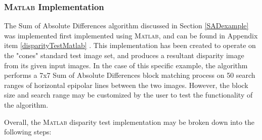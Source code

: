 \subsubsection{\textsc{Matlab} Implementation}
The Sum of Absolute Differences algorithm discussed in Section \ref{SADexample} was implemented first implemented using \textsc{Matlab}, and can be found in Appendix item \ref{disparityTestMatlab} \cite{mccormick}. This implementation has been created to operate on the "cones" standard test image set, and produces a resultant disparity image from its given input images. In the case of this specific example, the algorithm performs a 7x7 Sum of Absolute Differences block matching process on 50 search ranges of horizontal epipolar lines between the two images. However, the block size and search range may be customized by the user to test the functionality of the algorithm. 
\par
Overall, the \textsc{Matlab} disparity test implementation may be broken down into the following steps:
\par
\singlespacing
